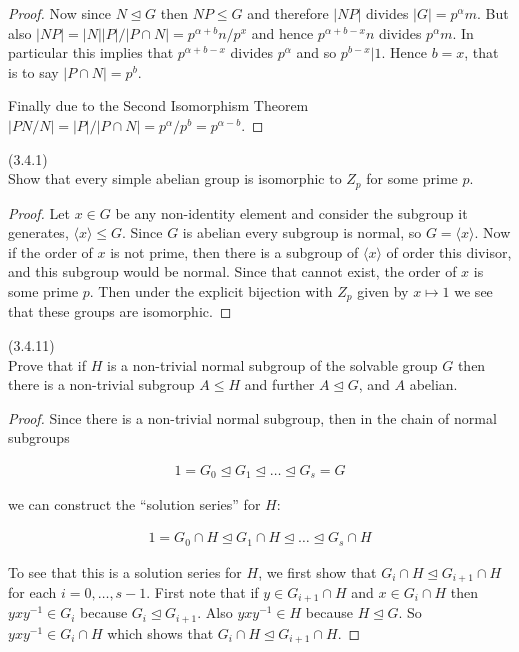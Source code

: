 \documentclass{exam}
\begin{document}
\begin{questions}
\begin{proof}
  Now since $N\trianglelefteq G$ then $NP \leq G$ and therefore $|NP|$ divides $|G|=p^\alpha m$.  But also $|NP|=|N||P|/|P\cap N|=p^{\alpha+b}n/p^x$ and hence $p^{\alpha+b-x}n$ divides $p^\alpha m$.  In particular this implies that $p^{\alpha+b-x}$ divides $p^\alpha$ and so $p^{b-x} | 1$.  Hence $b=x$, that is to say $|P\cap N|=p^b$.

  Finally due to the Second Isomorphism Theorem $|PN/N| = |P|/|P\cap N|=p^\alpha / p^b = p^{\alpha-b}$.
\end{proof}

\question(3.4.1)\\
Show that every simple abelian group is isomorphic to $Z_p$ for some prime $p$.

\begin{proof}
  Let $x\in G$ be any non-identity element and consider the subgroup it generates, $\langle x\rangle \leq G$.  Since $G$ is abelian every subgroup is normal, so $G = \langle x\rangle$.  Now if the order of $x$ is not prime, then there is a subgroup of $\langle x\rangle$ of order this divisor, and this subgroup would be normal.  Since that cannot exist, the order of $x$ is some prime $p$.  Then under the explicit bijection with $Z_p$ given by $x\mapsto 1$ we see that these groups are isomorphic.
\end{proof}

\question(3.4.11)\\
Prove that if $H$ is a non-trivial normal subgroup of the solvable group $G$ then there is a non-trivial subgroup $A\leq H$ and further $A\trianglelefteq G$, and $A$ abelian.

\begin{proof}
  Since there is a non-trivial normal subgroup, then in the chain of normal subgroups

  \begin{align*}
    1=G_0\trianglelefteq G_1 \trianglelefteq \dots \trianglelefteq G_s=G
  \end{align*}

  we can construct the ``solution series'' for $H$:

  \begin{align*}
    1=G_0\cap H \trianglelefteq G_1\cap H \trianglelefteq \dots \trianglelefteq G_s\cap H
  \end{align*}

  To see that this is a solution series for $H$, we first show that $G_i\cap H \trianglelefteq G_{i+1}\cap H$ for each $i=0,\dots,s-1$.  First note that if $y\in G_{i+1}\cap H$ and $x\in G_i\cap H$ then $yxy^{-1}\in G_i$ because $G_i\trianglelefteq G_{i+1}$.  Also $yxy^{-1}\in H$ because $H\trianglelefteq G$.  So $yxy^{-1}\in G_i\cap H$ which shows that $G_i\cap H\trianglelefteq G_{i+1}\cap H$.


\end{proof}
\end{questions}
\end{document}
